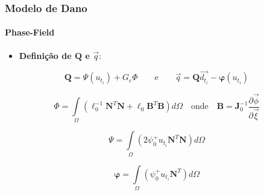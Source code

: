 \documentclass{beamer}
\begin{document}
\begin{frame}
    \frametitle{Modelo de Dano}
    \framesubtitle{Phase-Field}

    \begin{itemize}
        \item \textbf{Definição de \(\mathbf{Q}\) e \(\vec{q}\)}:
    \end{itemize}

    \begin{equation}
        \mathbf{Q} = \varPsi(u_{t_i}) + G_c \varPhi \qquad \text{e} \qquad \vec{q} = \mathbf{Q}\vec{d_{t_i}} - \boldsymbol{\varphi}(u_{t_i})
    \end{equation}


    \begin{equation}
        \varPhi = \int\limits_{\Omega} \left(\ell_0^{-1}\mathbf{N}^T \mathbf{N} + \ell_0\mathbf{B}^T \mathbf{B}\right) d\Omega \quad \text{onde} \quad \mathbf{B} = \mathbf{J}_0^{-1}\frac{\partial \vec{\phi}}{\partial\vec{\xi }}
    \end{equation}

    \begin{equation}
        \varPsi = \int\limits_{\Omega} \left(2\psi_0^+u_{t_i}\mathbf{N}^T \mathbf{N}\right) d\Omega
    \end{equation}

    \begin{equation}
        \boldsymbol{\varphi} = \int\limits_{\Omega} \left(\psi_0^+u_{t_i}\mathbf{N}^T \right) d\Omega
    \end{equation}


\end{frame}
\end{document}
